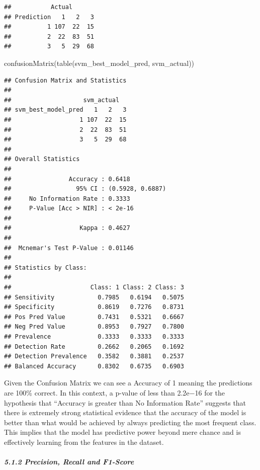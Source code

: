 \documentclass[
]{article}
\newenvironment{Shaded}{\begin{snugshade}}{\end{snugshade}}
\newcommand{\FunctionTok}[1]{\textcolor[rgb]{0.00,0.00,0.00}{#1}}
\newcommand{\NormalTok}[1]{#1}
\begin{document}
\begin{verbatim}
##           Actual
## Prediction   1   2   3
##          1 107  22  15
##          2  22  83  51
##          3   5  29  68
\end{verbatim}

\begin{Shaded}
\begin{Highlighting}[]
\FunctionTok{confusionMatrix}\NormalTok{(}\FunctionTok{table}\NormalTok{(svm\_best\_model\_pred, svm\_actual))}
\end{Highlighting}
\end{Shaded}

\begin{verbatim}
## Confusion Matrix and Statistics
## 
##                    svm_actual
## svm_best_model_pred   1   2   3
##                   1 107  22  15
##                   2  22  83  51
##                   3   5  29  68
## 
## Overall Statistics
##                                           
##                Accuracy : 0.6418          
##                  95% CI : (0.5928, 0.6887)
##     No Information Rate : 0.3333          
##     P-Value [Acc > NIR] : < 2e-16         
##                                           
##                   Kappa : 0.4627          
##                                           
##  Mcnemar's Test P-Value : 0.01146         
## 
## Statistics by Class:
## 
##                      Class: 1 Class: 2 Class: 3
## Sensitivity            0.7985   0.6194   0.5075
## Specificity            0.8619   0.7276   0.8731
## Pos Pred Value         0.7431   0.5321   0.6667
## Neg Pred Value         0.8953   0.7927   0.7800
## Prevalence             0.3333   0.3333   0.3333
## Detection Rate         0.2662   0.2065   0.1692
## Detection Prevalence   0.3582   0.3881   0.2537
## Balanced Accuracy      0.8302   0.6735   0.6903
\end{verbatim}

Given the Confusion Matrix we can see a Accuracy of 1 meaning the
predictions are 100\% correct. In this context, a p-value of less than
2.2e−16 for the hypothesis that ``Accuracy is greater than No
Information Rate'' suggests that there is extremely strong statistical
evidence that the accuracy of the model is better than what would be
achieved by always predicting the most frequent class. This implies that
the model has predictive power beyond mere chance and is effectively
learning from the features in the dataset.

\hypertarget{precision-recall-and-f1-score}{%
\subparagraph{5.1.2 Precision, Recall and
F1-Score}\label{precision-recall-and-f1-score}}
\end{document}
